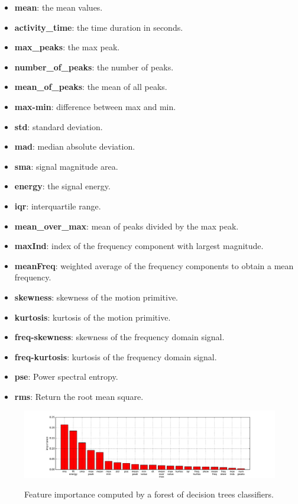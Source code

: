 \begin{itemize}
\item \textbf{mean}:  the mean values.
\item \textbf{activity\_time}: the time duration in seconds.
\item \textbf{max\_peaks}:  the max peak.
\item \textbf{number\_of\_peaks}:  the number of peaks.
\item \textbf{mean\_of\_peaks}: the mean of all peaks.
\item \textbf{max-min}: difference between max and min.
\item \textbf{std}: standard deviation.
\item \textbf{mad}: median absolute deviation.
\item \textbf{sma}: signal magnitude area.
\item \textbf{energy}: the signal energy.
\item \textbf{iqr}: interquartile range.
\item \textbf{mean\_over\_max}: mean of peaks divided by the max peak.
\item \textbf{maxInd}: index of the frequency component with largest magnitude.
\item \textbf{meanFreq}:  weighted average of the frequency components to obtain a mean frequency.
\item \textbf{skewness}:  skewness of the motion primitive.
\item \textbf{kurtosis}:  kurtosis of the motion primitive.
\item \textbf{freq-skewness}: skewness of the frequency domain signal.
\item \textbf{freq-kurtosis}: kurtosis of the frequency domain signal.
\item \textbf{pse}: Power spectral entropy.
\item \textbf{rms}: Return the root mean square.
\end{itemize}

\begin{figure}[htbp]
     \centering
     {\includegraphics[width=\textwidth]{images/04-activity/featureImportance}}
     \caption{Feature importance computed by a forest of decision trees classifiers.}
     \label{fig:feature_importance}
\end{figure}


